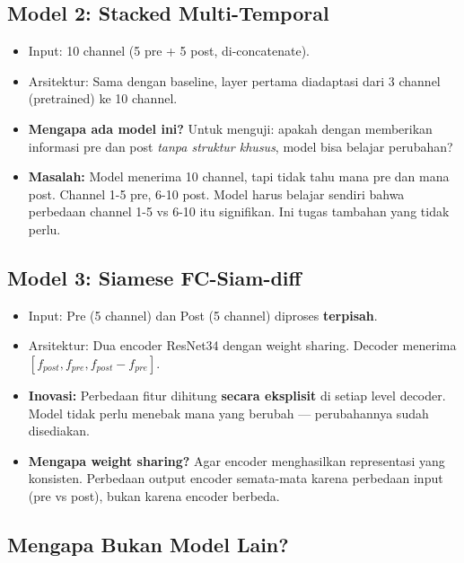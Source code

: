 \documentclass[10pt,a4paper,onecolumn]{article}
\begin{document}
\subsection{Model 2: Stacked Multi-Temporal}
\begin{itemize}[nosep]
    \item Input: 10 channel (5 pre + 5 post, di-concatenate).
    \item Arsitektur: Sama dengan baseline, layer pertama diadaptasi
          dari 3 channel (pretrained) ke 10 channel.
    \item \textbf{Mengapa ada model ini?} Untuk menguji: apakah
          dengan memberikan informasi pre dan post \textit{tanpa
          struktur khusus}, model bisa belajar perubahan?
    \item \textbf{Masalah:} Model menerima 10 channel, tapi tidak
          tahu mana pre dan mana post. Channel 1-5 pre, 6-10 post.
          Model harus belajar sendiri bahwa perbedaan channel 1-5
          vs 6-10 itu signifikan. Ini tugas tambahan yang tidak perlu.
\end{itemize}

\subsection{Model 3: Siamese FC-Siam-diff}
\begin{itemize}[nosep]
    \item Input: Pre (5 channel) dan Post (5 channel) diproses
          \textbf{terpisah}.
    \item Arsitektur: Dua encoder ResNet34 dengan weight sharing.
          Decoder menerima $[f_{post}, f_{pre}, f_{post} - f_{pre}]$.
    \item \textbf{Inovasi:} Perbedaan fitur dihitung \textbf{secara
          eksplisit} di setiap level decoder. Model tidak perlu
          menebak mana yang berubah — perubahannya sudah disediakan.
    \item \textbf{Mengapa weight sharing?} Agar encoder menghasilkan
          representasi yang konsisten. Perbedaan output encoder
          semata-mata karena perbedaan input (pre vs post), bukan
          karena encoder berbeda.
\end{itemize}

\subsection{Mengapa Bukan Model Lain?}
\end{document}
